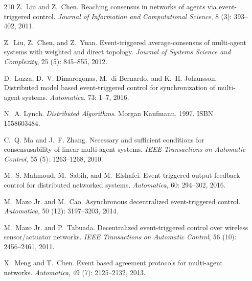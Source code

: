 \documentclass{autart}
\begin{document}
{\begin{thebibliography}{210}
Z.~Liu and Z.~Chen.
\newblock Reaching consensus in networks of agents via event-triggered control.
\newblock \emph{Journal of Information and Computational Science}, 8
  (3): 393--402, 2011.

Z.~Liu, Z.~Chen, and Z.~Yuan.
\newblock Event-triggered average-consensus of multi-agent systems with
  weighted and direct topology.
\newblock \emph{Journal of Systems Science and Complexity}, 25
  (5): 845--855, 2012{}.

D.~Luzza, D.~V. Dimarogonas, M.~{di Bernardo}, and K.~H. Johansson.
\newblock Distributed model based event-triggered control for synchronization
  of multi-agent systems.
\newblock \emph{Automatica}, 73: 1--7, 2016.

N.~A. Lynch.
\newblock \emph{Distributed Algorithms}.
\newblock Morgan Kaufmann, 1997.
\newblock ISBN 1558603484.

C.~Q. Ma and J.~F. Zhang.
\newblock Necessary and sufficient conditions for consensusability of linear
  multi-agent systems.
\newblock \emph{IEEE Transactions on Automatic Control}, 55
  (5): 1263--1268, 2010.

M.~S. Mahmoud, M.~Sabih, and M.~Elshafei.
\newblock Event-triggered output feedback control for distributed networked
  systems.
\newblock \emph{Automatica}, 60: 294--302, 2016.

M.~{Mazo Jr.} and M.~Cao.
\newblock Asynchronous decentralized event-triggered control.
\newblock \emph{Automatica}, 50 (12): 3197--3203, 2014.

M.~{Mazo Jr.} and P.~Tabuada.
\newblock Decentralized event-triggered control over wireless sensor/actuator
  networks.
\newblock \emph{IEEE Transactions on Automatic Control}, 56
  (10): 2456--2461, 2011.

X.~Meng and T.~Chen.
\newblock Event based agreement protocols for multi-agent networks.
\newblock \emph{Automatica}, 49 (7): 2125--2132, 2013.


\end{thebibliography}}
\end{document}
